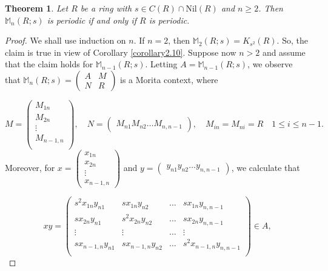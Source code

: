 \documentclass[12pt]{amsart}
\newtheorem{thm}{Theorem}[section]
\theoremstyle{definition}
\theoremstyle{remark}
\numberwithin{equation}{section}
\begin{document}
\begin{thm}\label{theorem2.11}
Let $R$ be a ring with $s\in C(R)\cap \mathrm{Nil}(R)$ and $n\geq 2$. Then $\mathbb{M}_n(R;s)$ is periodic if and only if $R$ is periodic.
\end{thm}

\begin{proof}
We shall use induction on $n$. If $n=2$, then $\mathbb{M}_2(R;s)=K_{s^2}(R)$. So, the claim is true in view of Corollary \ref{corollary2.10}. Suppose now $n >2$ and assume that the claim holds for $\mathbb{M}_{n-1}(R;s)$. Letting $A=\mathbb{M}_{n-1}(R;s)$, we observe that $\mathbb{M}_n(R;s)=\begin{pmatrix}
A & M \\
N & R
\end{pmatrix}$ is a Morita context, where

\[M=\begin{pmatrix}
M_{1n} \\
M_{2n}  \\
\vdots  \\
 M_{n-1,n} \\
\end{pmatrix} , \quad N=\begin{pmatrix}
 M_{n1} M_{n2} \ldots M_{n,n-1}
\end{pmatrix} , \quad M_{in}=M_{ni}=R \quad 1 \leq i \leq n-1. \]
Moreover, for $x=\begin{pmatrix}
                   x_{1n} \\ x_{2n} \\ \vdots \\ x_{n-1,n}
                 \end{pmatrix}$ and $y=\begin{pmatrix}
                                         y_{n1} y_{n2} \ldots y_{n,n-1}
                                       \end{pmatrix}$, we calculate that

\begin{equation} \label{star1}
xy=\begin{pmatrix}
s^2x_{1n}y_{n1} & sx_{1n}y_{n2}    & \ldots & sx_{1n}y_{n,n-1} \\
sx_{2n}y_{n1}    & s^2x_{2n}y_{n2} & \ldots & sx_{2n}y_{n,n-1} \\
        \vdots         &       \vdots           & \ldots & \vdots \\
sx_{n-1,n}y_{n1} & sx_{n-1,n}y_{n2} & \ldots & s^2x_{n-1,n}y_{n,n-1}\\
\end{pmatrix} \in A,
\end{equation}


\end{proof}
\end{document}
